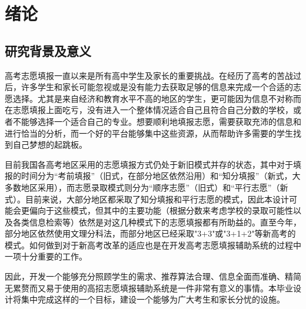\documentclass[a4paper,AutoFakeBold,oneside,12pt]{book}
\begin{document}
\blankmatter
  

\blankmatter
  

\blankmatter
  

\blankmatter
 

\frontmatter\tableofcontents %


\newpage\mainmatter
{}


\chapter{绪论}

\section{研究背景及意义}
高考志愿填报一直以来是所有高中学生及家长的重要挑战。在经历了高考的苦战过后，许多学生和家长可能忽视或是没有能力去获取足够的信息来完成一个合适的志愿选择。尤其是来自经济和教育水平不高的地区的学生，更可能因为信息不对称而在志愿填报上面吃亏，没有进入一个整体情况适合自己且符合自己分数的学校，或者不能够选择一个适合自己的专业。想要顺利地填报志愿，需要获取充沛的信息和进行恰当的分析，而一个好的平台能够集中这些资源，从而帮助许多需要的学生找到自己梦想的起跳板。

目前我国各高考地区采用的志愿填报方式仍处于新旧模式并存的状态，其中对于填报的时间分为“考前填报”（旧式，在部分地区依然沿用）和“知分填报”（新式，大多数地区采用），而志愿录取模式则分为“顺序志愿”（旧式）和“平行志愿”（新式）。目前来说，大部分地区都采取了知分填报和平行志愿的模式，因此本设计可能会更偏向于这些模式，但其中的主要功能（根据分数来考虑学校的录取可能性以及各类信息检索等）依然是对这几种模式下的志愿填报都有所助益的。直至今年，部分地区依然使用文理分科法，而部分地区已经采取"3+3"或"3+1+2"等新高考的模式。\cite{我国高考志愿填报机制的演变与优化}如何做到对于新高考改革的适应也是在开发高考志愿填报辅助系统的过程中一项十分重要的工作。

因此，开发一个能够充分照顾学生的需求、推荐算法合理、信息全面而准确、精简无累赘而又易于使用的高招志愿填报辅助系统是一件非常有意义的事情。本毕业设计将集中完成这样的一个目标，建设一个能够为广大考生和家长分忧的设施。
\end{document}
